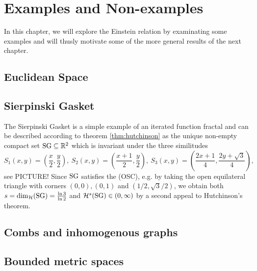 \chapter{Examples and Non-examples}

In this chapter, we will explore the Einstein relation by examinating some examples and will thusly motivate some of the more general results of the next chapter.

\section{Euclidean Space}

\section{Sierpinski Gasket}

The Sierpinski Gasket is a simple example of an iterated function fractal and can be described according to theorem \ref{thm:hutchinson} as the unique non-empty compact set $\operatorname{SG}\subseteq\mathbb{R}^2$ which is invariant under the three similitudes 
\[
  S_1(x,y)=\left(\frac{x}{2},\frac{y}{2}\right),\ 
  S_2(x,y)=\left(\frac{x+1}{2},\frac{y}{2}\right),\ 
  S_3(x,y)=\left(\frac{2x+1}{4},\frac{2y+\sqrt{3}}{4}\right),
\]
see PICTURE! Since $\operatorname{SG}$ satisfies the (OSC), e.g. by taking the open equilateral triangle with corners $(0,0), (0,1)$ and $(1/2,\sqrt{3}/2)$, we obtain both $s=\dim_{\mathcal{H}}(\operatorname{SG})=\frac{\ln 3}{\ln 2}$ and $\mathcal{H}^s(\operatorname{SG})\in(0,\infty)$ by a second appeal to Hutchinson's theorem.


\section{Combs and inhomogenous graphs}

\section{Bounded metric spaces}